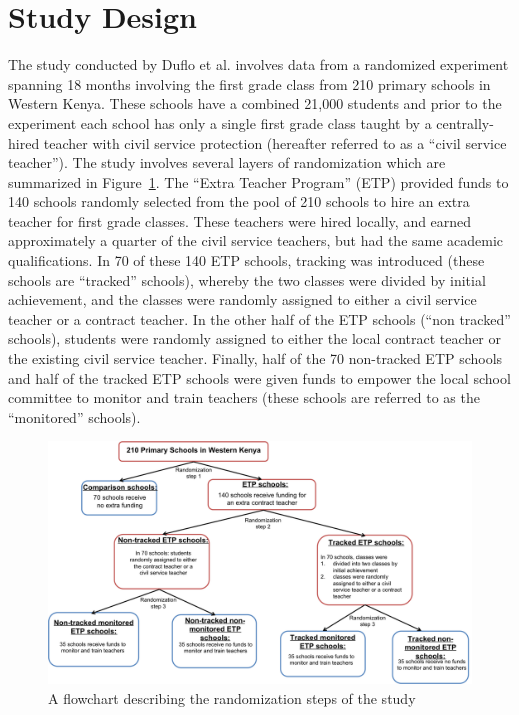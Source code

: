 \documentclass[11pt]{article}
\begin{document}
 \section{Study Design}
 
 The study conducted by Duflo et al. involves data from a randomized experiment spanning 18 months involving the first grade class from 210 primary schools in Western Kenya. These schools have a combined 21,000 students and prior to the experiment each school has only a single first grade class taught by a centrally-hired teacher with civil service protection (hereafter referred to as a ``civil service teacher''). The study involves several layers of randomization which are summarized in Figure~\ref{fig:randomization}. The ``Extra Teacher Program'' (ETP) provided funds to 140 schools randomly selected from the pool of 210 schools to hire an extra teacher for first grade classes. These teachers were hired locally, and earned approximately a quarter of the civil service teachers, but had the same academic qualifications. In 70 of these 140 ETP schools, tracking was introduced (these schools are ``tracked'' schools), whereby the two classes were divided by initial achievement, and the classes were randomly assigned to either a civil service teacher or a contract teacher. In the other half of the ETP schools (``non tracked'' schools), students were randomly assigned to either the local contract teacher or the existing civil service teacher. Finally, half of the 70 non-tracked ETP schools and half of the tracked ETP schools were given funds to empower the local school committee to monitor and train teachers (these schools are referred to as the ``monitored'' schools).
 
 \begin{figure}[H]
 \centering
 \includegraphics[scale=0.5]{Randomization_flow.png}
 \caption{A flowchart describing the randomization steps of the study}
 \label{fig:randomization}
 \end{figure}
 
\end{document}
